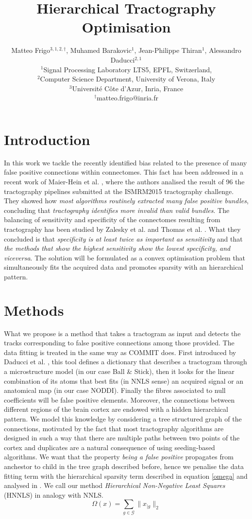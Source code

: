 \documentclass[10pt, a4paper]{article}
\title{Hierarchical Tractography Optimisation}
\date{}
\author{
Matteo Frigo$^{3,1,2,\dagger}$, Muhamed Barakovic$^{1}$, Jean-Philippe Thiran$^{1}$, Alessandro Daducci$^{2,1}$\\
$^{1}$Signal Processing Laboratory LTS5, EPFL, Switzerland,\\ $^{2}$Computer Science Department, University of Verona, Italy\\ $^{3}$Universit\'{e} C\^{o}te d'Azur, Inria, France\\
$^{\dagger}$matteo.frigo@inria.fr
}
\begin{document}
\maketitle
\section{Introduction}In this work we tackle the recently identified bias related to the presence of many false positive connections within connectomes. This fact has been addressed in a recent work of Maier-Hein et al. \cite{meierhein}, where the authors analised the result of 96 the tractography pipelines submitted at the ISMRM2015 tractography challenge. They showed how \emph{most algorithms routinely extracted many false positive bundles}, concluding that \emph{tractography identifies more invalid than valid bundles}. The balancing of sensitivity and specificity of the connectomes resulting from tractography has been studied by Zalesky et al. \cite{zalesky} and Thomas et al. \cite{thomas}. What they concluded is that \emph{specificity is at least twice as important as sensitivity} and that \emph{the methods that show the highest sensitivity show the lowest specificity, and viceversa}. The solution will be formulated as a convex optimisation problem that simultaneously fits the acquired data and promotes sparsity with an hierarchical pattern.

\section{Methods}What we propose is a method that takes a tractogram as input and detects the tracks corresponding to false positive connections among those provided. The data fitting is treated in the same way as COMMIT does. First introduced by Daducci et al. \cite{daducci}, this tool defines a dictionary that describes a tractogram through a microstructure model (in our case Ball \& Stick), then it looks for the linear combination of its atoms that best fits (in NNLS sense) an acquired signal or an anatomical map (in our case NODDI). Finally the fibres associated to null coefficients will be false positive elements. Moreover, the connections between different regions of the brain cortex are endowed with a hidden hierarchical pattern. We model this knowledge by considering a tree structured graph of the connections, motivated by the fact that most tractography algorithms are designed in such a way that there are multiple paths between two points of the cortex and duplicates are a natural consequence of using seeding-based algorithms. We want that the property \emph{being a false positive} propagates from anchestor to child in the tree graph described before, hence we penalise the data fitting term with the hierarchical sparsity term described in equation \eqref{omega} and analysed in \cite{jenatton}. We call our method \emph{Hierarchical Non-Negative Least Squares} (HNNLS) in analogy with NNLS.
\begin{equation}
\label{omega} \Omega(x) = \sum_{g\in\mathcal{G}}\|x_{|g}\|_2
\end{equation}
\end{document}
